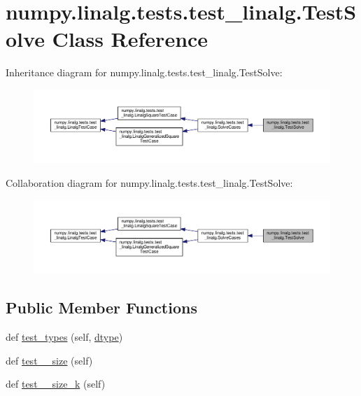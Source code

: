 \hypertarget{classnumpy_1_1linalg_1_1tests_1_1test__linalg_1_1TestSolve}{}\section{numpy.\+linalg.\+tests.\+test\+\_\+linalg.\+Test\+Solve Class Reference}
\label{classnumpy_1_1linalg_1_1tests_1_1test__linalg_1_1TestSolve}


Inheritance diagram for numpy.\+linalg.\+tests.\+test\+\_\+linalg.\+Test\+Solve\+:
\nopagebreak
\begin{figure}[H]
\begin{center}
\leavevmode
\includegraphics[width=350pt]{classnumpy_1_1linalg_1_1tests_1_1test__linalg_1_1TestSolve__inherit__graph}
\end{center}
\end{figure}


Collaboration diagram for numpy.\+linalg.\+tests.\+test\+\_\+linalg.\+Test\+Solve\+:
\nopagebreak
\begin{figure}[H]
\begin{center}
\leavevmode
\includegraphics[width=350pt]{classnumpy_1_1linalg_1_1tests_1_1test__linalg_1_1TestSolve__coll__graph}
\end{center}
\end{figure}
\subsection*{Public Member Functions}
\begin{DoxyCompactItemize}
\item 
def \hyperlink{classnumpy_1_1linalg_1_1tests_1_1test__linalg_1_1TestSolve_a7267d0832d1cc9354ccbb92161433d7e}{test\+\_\+types} (self, \hyperlink{namespacenumpy_1_1linalg_1_1tests_1_1test__linalg_a1063ea74fa35b7244592f8a89b8a71a2}{dtype})
\item 
def \hyperlink{classnumpy_1_1linalg_1_1tests_1_1test__linalg_1_1TestSolve_a6580a3cf58356252c1f1e2dd4a9247a0}{test\+\_\+\_\+size} (self)
\item 
def \hyperlink{classnumpy_1_1linalg_1_1tests_1_1test__linalg_1_1TestSolve_a805938e85b8bc62ab4e73051f9b0c638}{test\+\_\+\_\+size\+\_\+k} (self)
\end{DoxyCompactItemize}

